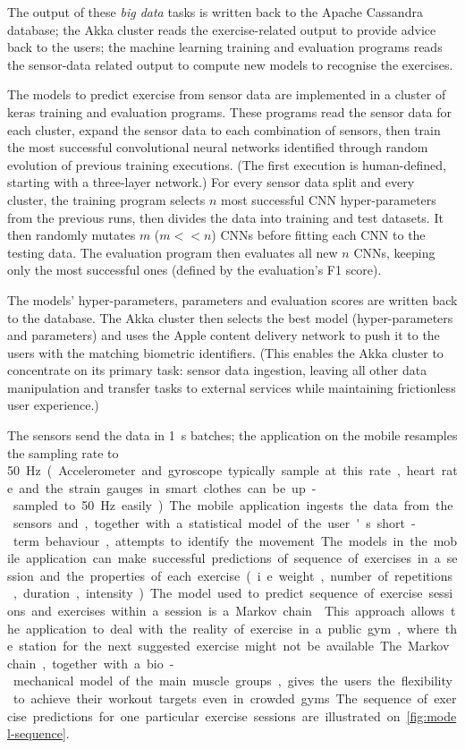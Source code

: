 \documentclass[a4paper, 10 pt, conference]{IEEEtran}
\begin{document}
The output of these \emph{big data} tasks is written back to the Apache Cassandra database; the Akka cluster reads the exercise-related output to provide advice back to the users; the machine learning training and evaluation programs reads the sensor-data related output to compute new models to recognise the exercises.

The models to predict exercise from sensor data are implemented in a cluster of keras \cite{keras} training and evaluation programs. These programs read the sensor data for each cluster, expand the sensor data to each combination of sensors, then train the most successful convolutional neural networks identified through random evolution of previous training executions. (The first execution is human-defined, starting with a three-layer network.) For every sensor data split and every cluster, the training program selects $n$ most successful CNN hyper-parameters from the previous runs, then divides the data into training and test datasets. It then randomly mutates $m$ ($m << n$) CNNs before fitting each CNN to the testing data. The evaluation program then evaluates all new $n$ CNNs, keeping only the most successful ones (defined by the evaluation's F1 score).

The models' hyper-parameters, parameters and evaluation scores are written back to the database. The Akka cluster then selects the best model (hyper-parameters and parameters) and uses the Apple content delivery network to push it to the users with the matching biometric identifiers. (This enables the Akka cluster to concentrate on its primary task: sensor data ingestion, leaving all other data manipulation and transfer tasks to external services while maintaining frictionless user experience.)

The sensors send the data in \SI{1}{\second} batches; the application on the mobile resamples the sampling rate to \SI{50}\hertz. (Accelerometer and gyroscope typically sample at this rate, heart rate and the strain gauges in smart clothes can be up-sampled to \SI{50}{\hertz} easily.) The mobile application ingests the data from the sensors and, together with a statistical model of the user's short-term behaviour, attempts to identify the movement. The models in the mobile application can make successful predictions of sequence of exercises in a session and the properties of each exercise (i.e. weight, number of repetitions, duration, intensity). The model used to predict sequence of exercise sessions and exercises within a session is a Markov chain \cite{markov-chain-exercise}. This approach allows the application to deal with the reality of exercise in a public gym, where the station for the next suggested exercise might not be available. The Markov chain, together with a bio-mechanical model of the main muscle groups, gives the users the flexibility to achieve their workout targets even in crowded gyms. The sequence of exercise predictions for one particular exercise sessions are illustrated on \autoref{fig:model-sequence}.
\end{document}
